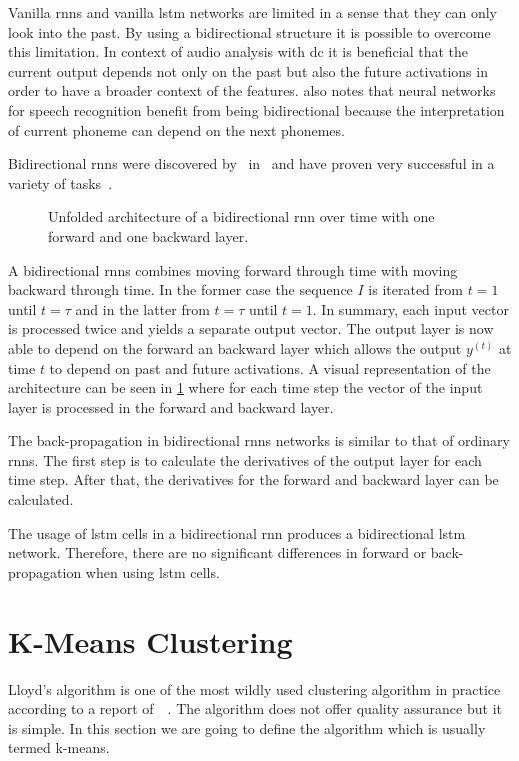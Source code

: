 Vanilla \glspl{rnn} and vanilla \gls{lstm} networks are limited in a sense that they can only look into the past. By using a bidirectional structure it is possible to overcome this limitation. In context of audio analysis with \gls{dc} it is beneficial that the current output depends not only on the past but also the future activations in order to have a broader context of the features.
\textcite{Goodfellow2016} also notes that neural networks for speech recognition benefit from being bidirectional because the interpretation of current phoneme can depend on the next phonemes.

Bidirectional \glspl{rnn} were discovered by~\textcite{Schuster1997} in~\citeyear{Schuster1997} and have proven very successful in a variety of tasks~\cite[p.~25]{Graves2012}.

\begin{figure}[ht]
	\centering
	
	\caption{Unfolded architecture of a bidirectional \gls{rnn} over time with one forward and one backward layer.}
	\label{fig.bidi-rnn}
\end{figure}

A bidirectional \glspl{rnn} combines moving forward through time with moving backward through time. In the former case the sequence $I$ is iterated from $t=1$ until $t=\tau$ and in the latter from $t=\tau$ until $t=1$. In summary, each input vector is processed twice and yields a separate output vector. The output layer is now able to depend on the forward an backward layer which allows the output $y^{(t)}$ at time $t$ to depend on past and future activations.
A visual representation of the architecture can be seen in \ref{fig.bidi-rnn} where for each time step the vector of the input layer is processed in the forward and backward layer.

The back-propagation in bidirectional \glspl{rnn} networks is similar to that of ordinary \glspl{rnn}. The first step is to calculate the derivatives of the output layer for each time step.
After that, the derivatives for the forward and backward layer can be calculated.

The usage of \gls{lstm} cells in a bidirectional \gls{rnn} produces a bidirectional \gls{lstm} network. Therefore, there are no significant differences in forward or back-propagation when using \gls{lstm} cells.

\section{K-Means Clustering}\label{sec.k-means}
Lloyd's algorithm is one of the most wildly used clustering algorithm in practice according to a report of~\citeyear{Berkhin2002}~\cite{Berkhin2002}. The algorithm does not offer quality assurance but it is simple. In this section we are going to define the algorithm which is usually termed k-means.


